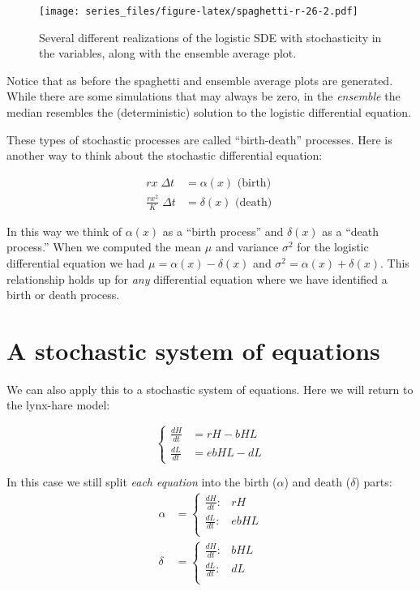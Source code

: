 \documentclass[
]{book}
\theoremstyle{definition}
\theoremstyle{definition}
\theoremstyle{definition}
\theoremstyle{remark}
\begin{document}
\begin{figure}
\centering
\texttt{[image: series\_files/figure-latex/spaghetti-r-26-2.pdf]}
\caption{\label{fig:spaghetti-r-26-2}Several different realizations of the logistic SDE with stochasticity in the variables, along with the ensemble average plot.}
\end{figure}

Notice that as before the spaghetti and ensemble average plots are generated. While there are some simulations that may always be zero, in the \emph{ensemble} the median resembles the (deterministic) solution to the logistic differential equation.

These types of stochastic processes are called ``birth-death'' processes. Here is another way to think about the stochastic differential equation:

\begin{align*}
r x \; \Delta t   &= \alpha(x)  \mbox{ (birth) }\\
\frac{rx^{2}}{K} \; \Delta t &= \delta(x) \mbox{ (death) }
 \end{align*}

In this way we think of \(\alpha(x)\) as a ``birth process'' and \(\delta(x)\) as a ``death process.'' When we computed the mean \(\mu\) and variance \(\sigma^{2}\) for the logistic differential equation we had \(\mu = \alpha(x)-\delta(x)\) and \(\sigma^{2}=\alpha(x)+\delta(x)\). This relationship holds up for \emph{any} differential equation where we have identified a birth or death process.

\hypertarget{a-stochastic-system-of-equations}{%
\section{A stochastic system of equations}\label{a-stochastic-system-of-equations}}

We can also apply this to a stochastic system of equations. Here we will return to the lynx-hare model:

\begin{equation}
\begin{cases}
\frac{dH}{dt} &= r H - b HL \\
\frac{dL}{dt} &=ebHL -dL
\end{cases}
\end{equation}

In this case we still split \emph{each equation} into the birth (\(\alpha\)) and death (\(\delta\)) parts:
\begin{align*}
\alpha & =
\begin{cases}
\frac{dH}{dt}: & r H \\
\frac{dL}{dt}: & ebHL\\
\end{cases} \\
\delta & =
\begin{cases}
\frac{dH}{dt}: & bHL \\
\frac{dL}{dt}: & dL\\
\end{cases} 
\end{align*}
\end{document}
